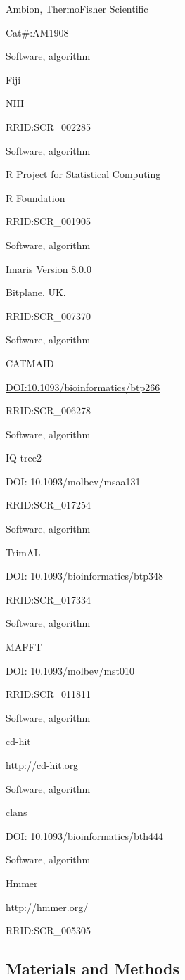 \documentclass[
  10pt,
  onecolumn]{article}
\begin{document}
Ambion, ThermoFisher Scientific

Cat\#:AM1908

Software, algorithm

Fiji

NIH

RRID:SCR\_002285

Software, algorithm

R Project for Statistical Computing

R Foundation

RRID:SCR\_001905

Software, algorithm

Imaris Version 8.0.0

Bitplane, UK.

RRID:SCR\_007370

Software, algorithm

CATMAID

\url{DOI:10.1093/bioinformatics/btp266}

RRID:SCR\_006278

Software, algorithm

IQ-tree2

DOI: 10.1093/molbev/msaa131

RRID:SCR\_017254

Software, algorithm

TrimAL

DOI: 10.1093/bioinformatics/btp348

RRID:SCR\_017334

Software, algorithm

MAFFT

DOI: 10.1093/molbev/mst010

RRID:SCR\_011811

Software, algorithm

cd-hit

\url{http://cd-hit.org}

Software, algorithm

clans

DOI: 10.1093/bioinformatics/bth444

Software, algorithm

Hmmer

\url{http://hmmer.org/}

RRID:SCR\_005305

\hypertarget{materials-and-methods}{%
\subsection{Materials and Methods}\label{materials-and-methods}}
\end{document}
